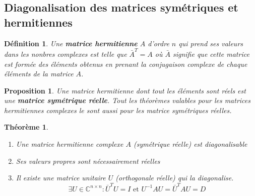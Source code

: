 \documentclass{article}[french, babel]
\newtheorem{mydef}{Définition}
\newtheorem{myprop}{Proposition}
\newtheorem{mythm}{Théorème}
\begin{document}
	\subsection{Diagonalisation des matrices symétriques et hermitiennes}
		 \begin{mydef}
		 	Une \textbf{matrice hermitienne} $A$ d'ordre $n$ qui prend ses valeurs dans les nonbres complexes est telle que $\bar{A}^T=A$ où $\bar{A}$ signifie que cette matrice est formée des éléments obtenus en prenant la conjugaison complexe de chaque éléments de la matrice $A$.
		 \end{mydef}
		 \begin{myprop}
		 	Une matrice hermitienne dont tout les éléments sont réels est une \textbf{matrice symétrique réelle}. Tout les théorèmes valables pour les matrices hermitiennes complexes le sont aussi pour les matrice symétriques réelles.
		 \end{myprop}
	 	\begin{mythm}
	 		~
	 		\begin{enumerate}
	 			\item Une matrice hermitienne complexe $A$ (symétrique réelle) est diagonalisable
	 			\item Ses valeurs propres sont nécessairement réelles
	 			\item Il existe une matrice unitaire $U$ (orthogonale réelle) qui la diagonalise. \[\exists U\in\mathbb{C}^{n\times n}:\bar{U}^TU=I\text{ et } U^{-1}AU=\bar{U}^TAU=D\]
	 		\end{enumerate}
	 	\end{mythm}
	\newpage
	\printindex
\end{document}
